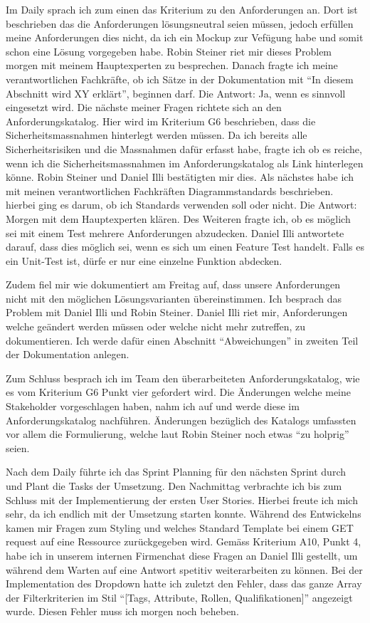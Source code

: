 Im Daily sprach ich zum einen das Kriterium zu den Anforderungen an. Dort ist beschrieben das die Anforderungen lösungsneutral seien müssen, jedoch
erfüllen meine Anforderungen dies nicht, da ich ein Mockup zur Vefügung habe und somit schon eine Lösung vorgegeben habe. Robin Steiner
riet mir dieses Problem morgen mit meinem Hauptexperten zu besprechen. Danach fragte ich meine verantwortlichen Fachkräfte, ob ich Sätze in der Dokumentation
mit ``In diesem Abschnitt wird XY erklärt'', beginnen darf. Die Antwort: Ja, wenn es sinnvoll eingesetzt wird. Die nächste meiner Fragen richtete sich an den 
Anforderungskatalog. Hier wird im Kriterium G6 beschrieben, dass die Sicherheitsmassnahmen hinterlegt werden müssen.
Da ich bereits alle Sicherheitsrisiken und die Massnahmen dafür erfasst habe, fragte ich ob es reiche, wenn ich die Sicherheitsmassnahmen im Anforderungskatalog als
Link hinterlegen könne. Robin Steiner und Daniel Illi bestätigten mir dies. Als nächstes habe ich mit meinen verantwortlichen Fachkräften Diagrammstandards beschrieben.
hierbei ging es darum, ob ich Standards verwenden soll oder nicht. Die Antwort: Morgen mit dem Hauptexperten klären.
Des Weiteren fragte ich, ob es möglich sei mit einem Test mehrere Anforderungen abzudecken. Daniel Illi antwortete darauf, dass
dies möglich sei, wenn es sich um einen Feature Test handelt. Falls es ein Unit-Test ist, dürfe er nur eine einzelne Funktion abdecken. 

Zudem fiel mir wie dokumentiert am Freitag auf, dass unsere Anforderungen nicht mit den möglichen Lösungsvarianten
übereinstimmen. Ich besprach das Problem mit Daniel Illi und Robin Steiner. Daniel Illi riet mir, Anforderungen welche geändert werden müssen oder
welche nicht mehr zutreffen, zu dokumentieren. Ich werde dafür einen Abschnitt ``Abweichungen'' in zweiten Teil der Dokumentation anlegen. 

Zum Schluss besprach ich im Team den überarbeiteten Anforderungskatalog, wie es vom Kriterium G6 Punkt vier gefordert wird. Die Änderungen welche meine Stakeholder 
vorgeschlagen haben, nahm ich auf und werde diese im Anforderungskatalog nachführen. Änderungen bezüglich des Katalogs umfassten vor allem die Formulierung,
welche laut Robin Steiner noch etwas ``zu holprig'' seien.

Nach dem Daily führte ich das Sprint Planning für den nächsten Sprint durch und Plant die Tasks der Umsetzung.
Den Nachmittag verbrachte ich bis zum Schluss mit der Implementierung der ersten User Stories. Hierbei freute ich mich sehr, da 
ich endlich mit der Umsetzung starten konnte. Während des Entwickelns kamen mir Fragen zum Styling und welches Standard Template bei einem 
GET request auf eine Ressource zurückgegeben wird. Gemäss Kriterium A10, Punkt 4, habe ich in unserem internen Firmenchat diese Fragen an Daniel Illi gestellt,
um während dem Warten auf eine Antwort spetitiv weiterarbeiten zu können. Bei der Implementation des Dropdown hatte ich zuletzt den Fehler, 
dass das ganze Array der Filterkriterien im Stil ``[Tags, Attribute, Rollen, Qualifikationen]'' angezeigt wurde. Diesen Fehler muss ich morgen noch beheben.


